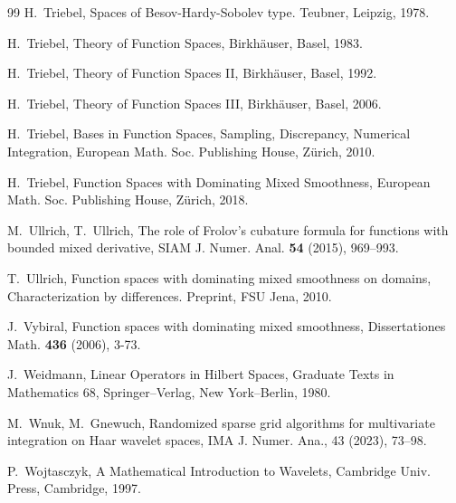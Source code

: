 \documentclass[12pt]{article}
\begin{document}
{\begin{thebibliography}{99}
 H.~Triebel, Spaces of Besov-Hardy-Sobolev type. Teubner, Leipzig, 1978. 

 H.~Triebel, Theory of Function Spaces, Birkh\"auser, Basel, 1983. 

 H.~Triebel, Theory of Function Spaces II, Birkh\"auser, Basel, 1992.

 H.~Triebel, Theory of Function Spaces III, Birkh\"auser, Basel, 2006.

 H.~Triebel, Bases in Function Spaces, Sampling, Discrepancy, Numerical Integration, European Math. Soc. Publishing House, Z{\"u}rich, 2010.

 H.~Triebel, Function Spaces with Dominating Mixed Smoothness, 
European Math. Soc. Publishing House, Z{\"u}rich, 2018.

M.~Ullrich, T.~Ullrich, The role of Frolov's cubature formula for functions with bounded mixed derivative, SIAM J. Numer. Anal. {\bf 54} (2015), 969--993.

T.~Ullrich, Function spaces with dominating mixed smoothness on domains,
Characterization by differences. Preprint, FSU Jena, 2010.

J.~Vybiral, Function spaces with dominating mixed smoothness,
Dissertationes  Math. {\bf 436} (2006), 3-73.




   J.~Weidmann, Linear Operators in Hilbert Spaces,
   Graduate Texts in   Mathematics 68, Springer--Verlag,
   New York--Berlin, 1980.
   
   M.~Wnuk, M.~Gnewuch, Randomized sparse grid algorithms for multivariate integration on Haar wavelet spaces, IMA J. Numer. Ana., 43 (2023), 73--98.


{P.~Wojtasczyk}, {A Mathematical Introduction to Wavelets},
Cambridge Univ. Press, Cambridge, 1997.

\end{thebibliography}
}
\end{document}
